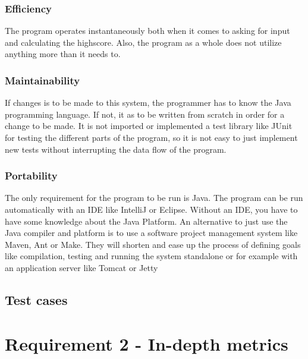 \documentclass[UKenglish]{article}  %
\begin{document}
\subsubsection{Efficiency}
The program operates instantaneously both when it comes to asking for input and
calculating the highscore. Also, the program as a whole does not utilize
anything more than it needs to.

\subsubsection{Maintainability} %
If changes is to be made to this system, the programmer has to know the Java
programming language. If not, it as to be written from scratch in order for a
change to be made. It is not imported or implemented a test library like JUnit
for testing the different parts of the program, so it is not easy to just
implement new tests without interrupting the data flow of the program.

\subsubsection{Portability}
The only requirement for the program to be run is Java. The program can be run
automatically with an IDE like IntelliJ or Eclipse. Without an IDE, you have to
have some knowledge about the Java Platform. An alternative to just use the Java
compiler and platform is to use a software project management system like Maven,
Ant or Make. They will shorten and ease up the process of defining goals like
compilation, testing and running the system standalone or for example with an
application server like Tomcat or Jetty


\subsection{Test cases}

\section{Requirement 2 - In-depth metrics}
\end{document}
